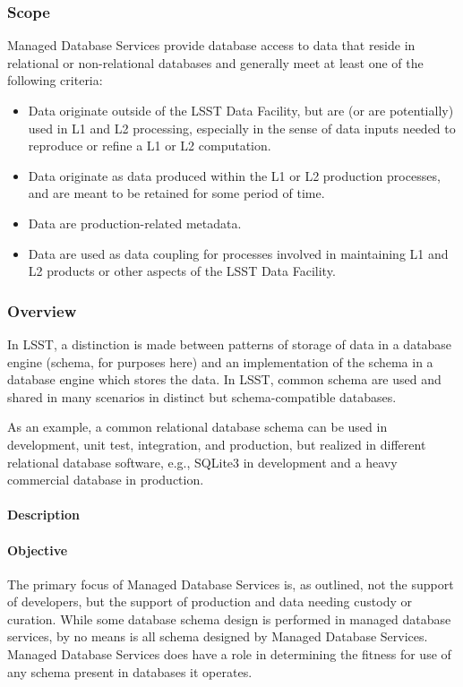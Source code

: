 ﻿\subsubsection{Scope}

Managed Database Services provide database access to data that reside in relational or non-relational databases
and generally meet at least one of the following criteria:
\begin{itemize}
\item Data originate outside of the LSST Data Facility, but are (or are potentially) used in L1 and L2 processing,
especially in the sense of data inputs needed to reproduce or refine a L1 or L2 computation.
\item Data originate as data produced within the L1 or L2 production processes, and are meant to be retained for some period of time.
\item Data are production-related metadata.
\item Data are used as data coupling for processes involved in maintaining L1 and L2 products or other aspects of the LSST Data Facility.
\end{itemize}

\subsubsection{Overview}

In LSST, a distinction is made between patterns of storage of
data in a database engine (schema, for purposes here) and an
implementation of the schema in a database engine which stores the
data. In LSST, common schema are used and shared in many scenarios in
distinct but schema-compatible databases.

As an example, a common relational database schema can be used in
development, unit test, integration, and production, but realized in
different relational database software, e.g., SQLite3 in development
and a heavy commercial database in production.

\paragraph{Description}

\paragraph{Objective}

The primary focus of Managed Database Services is, as outlined, not the support 
of developers, but the support of production and data needing custody or curation. 
While some database schema design is performed in managed database services, 
by no means is all schema designed by Managed Database Services. Managed Database 
Services does have a role in determining the fitness for use of any schema present in 
databases it operates.

